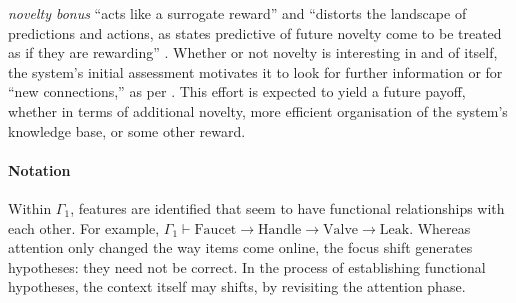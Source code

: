 \begin{description}
  \emph{novelty bonus} ``acts like a surrogate reward'' and ``distorts
  the landscape of predictions and actions, as states predictive of
  future novelty come to be treated as if they are rewarding''
  \cite[p.~554]{kakade2002dopamine}.  Whether or not novelty is
  interesting in and of itself, the system's initial assessment
  motivates it to look for further information or for ``new
  connections,'' as per \citet{Makri2012a}.  This effort is expected
  to yield a future payoff, whether in terms of additional novelty,
  more efficient organisation of the system's knowledge base, or some
  other reward.
\end{description}

\paragraph{\textbf{\upshape Notation}}

Within $\Gamma_1$, features are identified that seem to have
functional relationships with each other.  For example, $\Gamma_1
\vdash \mathrm{Faucet} \rightarrow \mathrm{Handle} \rightarrow
\mathrm{Valve} \rightarrow \mathrm{Leak}$. Whereas attention only
changed the way items come online, the focus shift generates
hypotheses: they need not be correct.  In the process of establishing
functional hypotheses, the context itself may shifts, by revisiting
the attention phase.


